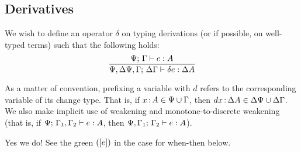 \documentclass{article}
\begin{document}

\subsection{Derivatives}

We wish to define an operator $\delta$ on typing derivations (or if possible, on
well-typed terms) such that the following holds:
\[\infer{\J{\GP,\GD\GP,\GG}{\GD\GG}{\delta e}{\Delta A}}
        {\J{\GP}{\GG}{e}{A}}
\]

As a matter of convention, prefixing a variable with $d$ refers to the
corresponding variable of its change type. That is, if $x \,{:}\, A \in \Psi \cup
\Gamma$, then $dx \,{:}\, \Delta A \in \Delta\Psi \cup \Delta\Gamma$. We also make implicit use of
weakening and monotone-to-discrete weakening (that is, if
${\Psi};\,{\Gamma_1,\Gamma_2}\vdash {e}:{A}$, then ${\Psi,\Gamma_1};\,{\Gamma_2}\vdash {e}:{A}$).

 {\color{ForestGreen} Yes we do!
  See the green $([{e}])$ in the case for \textsf{when-then} below.}
\end{document}
